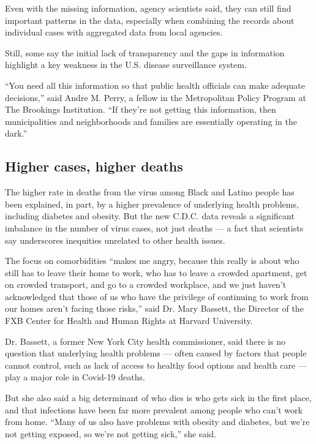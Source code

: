 Even with the missing information, agency scientists said, they can
still find important patterns in the data, especially when combining the
records about individual cases with aggregated data from local agencies.

Still, some say the initial lack of transparency and the gaps in
information highlight a key weakness in the U.S. disease surveillance
system.

``You need all this information so that public health officials can make
adequate decisions,'' said Andre M. Perry, a fellow in the Metropolitan
Policy Program at The Brookings Institution. ``If they're not getting
this information, then municipalities and neighborhoods and families are
essentially operating in the dark.''

\hypertarget{higher-cases-higher-deaths}{%
\subsection{Higher cases, higher
deaths}\label{higher-cases-higher-deaths}}

The higher rate in deaths from the virus among Black and Latino people
has been explained, in part, by a higher prevalence of underlying health
problems, including diabetes and obesity. But the new C.D.C. data
reveals a significant imbalance in the number of virus cases, not just
deaths --- a fact that scientists say underscores inequities unrelated
to other health issues.

The focus on comorbidities ``makes me angry, because this really is
about who still has to leave their home to work, who has to leave a
crowded apartment, get on crowded transport, and go to a crowded
workplace, and we just haven't acknowledged that those of us who have
the privilege of continuing to work from our homes aren't facing those
risks,'' said Dr. Mary Bassett, the Director of the FXB Center for
Health and Human Rights at Harvard University.

Dr. Bassett, a former New York City health commissioner, said there is
no question that underlying health problems --- often caused by factors
that people cannot control, such as lack of access to healthy food
options and health care --- play a major role in Covid-19 deaths.

But she also said a big determinant of who dies is who gets sick in the
first place, and that infections have been far more prevalent among
people who can't work from home. ``Many of us also have problems with
obesity and diabetes, but we're not getting exposed, so we're not
getting sick,'' she said.


